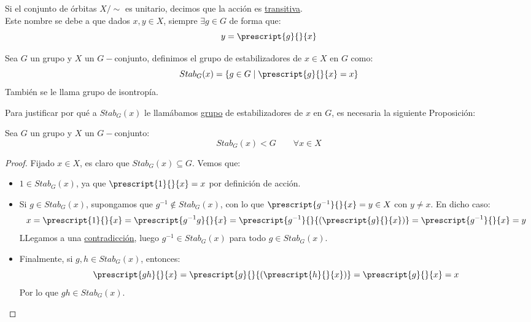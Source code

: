 \begin{definicion}
    Si el conjunto de órbitas $X/\sim$ es unitario, decimos que la acción es \underline{transitiva}.\\

    \noindent
    Este nombre se debe a que dados $x,y\in X$, siempre $\exists g\in G$ de forma que:
    \begin{equation*}
        y = \prescript{g}{}{x}
    \end{equation*}
\end{definicion}

\begin{definicion}[Estabilizador]
    Sea $G$ un grupo y $X$ un $G-$conjunto, definimos el grupo de estabilizadores de $x\in X$ en $G$ como:
    \begin{equation*}
        Stab_G(x) = \{g\in G \mid \prescript{g}{}{x} = x\}
    \end{equation*}
    También se le llama grupo de isontropía.
\end{definicion}

\noindent
Para justificar por qué a $Stab_G(x)$ le llamábamos \underline{grupo} de estabilizadores de $x$ en $G$, es necesaria la siguiente Proposición:
\begin{prop}
    Sea $G$ un grupo y $X$ un $G-$conjunto:
    \begin{equation*}
        Stab_G(x) < G \qquad \forall x\in X
    \end{equation*}
    \begin{proof}
        Fijado $x\in X$, es claro que $Stab_G(x) \subseteq G$. Vemos que:
        \begin{itemize}
            \item $1\in Stab_G(x)$, ya que $\prescript{1}{}{x} = x$ por definición de acción.
            \item Si $g\in Stab_G(x)$, supongamos que $g^{-1}\notin Stab_G(x)$, con lo que $\prescript{g^{-1}}{}{x} = y \in X$ con $y\neq x$. En dicho caso:
                \begin{equation*}
                    x = \prescript{1}{}{x} = \prescript{g^{-1}g}{}{x} = \prescript{g^{-1}}{}{(\prescript{g}{}{x})} = \prescript{g^{-1}}{}{x} = y
                \end{equation*}
                LLegamos a una \underline{contradicción}, luego $g^{-1}\in Stab_G(x)$ para todo $g\in Stab_G(x)$.
            \item Finalmente, si $g,h\in Stab_G(x)$, entonces:
                \begin{equation*}
                    \prescript{gh}{}{x} = \prescript{g}{}{(\prescript{h}{}{x})} = \prescript{g}{}{x} = x
                \end{equation*}
                Por lo que $gh \in Stab_G(x)$.
        \end{itemize}
    \end{proof}
\end{prop}

